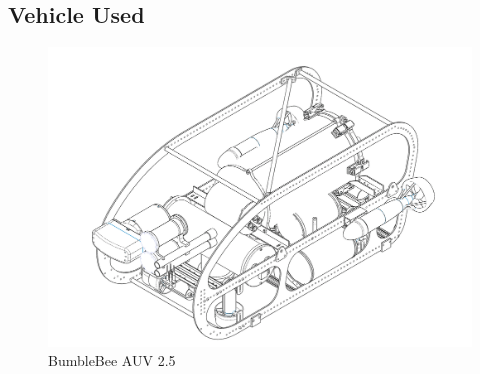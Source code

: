 \documentclass[15pt]{article}
\begin{document}
\subsection{Vehicle Used}

\begin{figure}[h!]
  \centering
  \includegraphics[scale=0.2]{bbauv25}
  \captionsetup{justification=centering}
  \caption{BumbleBee AUV 2.5}
\end{figure}
\end{document}
